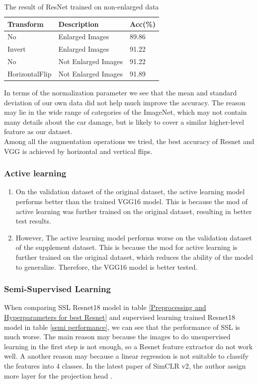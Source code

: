 \documentclass[lang=english,inputenc=utf8,fontsize=10pt]{ldvarticle}
\begin{document}
\begin{table}[H]   
\begin{center}   
\caption{The result of ResNet trained on non-enlarged data}  
\label{table:1} 
\begin{tabular}{|m{2.4cm}<{\centering}|m{6cm}<{\centering}|m{2.0cm}<{\centering}|}   
\hline   \textbf{Transform} & \textbf{Description} & \textbf{Acc(\%)} \\   
\hline   No & Enlarged Images & 89.86  \\  
\hline   Invert & Enlarged Images & 91.22  \\      
\hline   No & Not Enlarged Images & 91.22  \\  
\hline   HorizontalFlip & Not Enlarged Images & 91.89  \\      
\hline   
\end{tabular}   
\end{center}   
\end{table}

In terms of the normalization parameter we see that the mean and standard deviation of our own data did not help much improve the accuracy. The reason may lie in the wide range of categories of the ImageNet, which may not contain many details about the car damage, but is likely to cover a similar higher-level feature as our dataset.\\

Among all the augmentation operations we tried, the best accuracy of Resnet and VGG is achieved by horizontal and vertical flips.


\subsubsection{Active learning}
    \begin{enumerate}
        \item On the validation dataset of the original dataset, the active learning model performs better than the trained VGG16 model. This is because the mod of active learning was further trained on the original dataset, resulting in better test results.
        \item However, The active learning model performs worse on the validation dataset of the supplement dataset. This is because the mod for active learning is further trained on the original dataset, which reduces the ability of the model to generalize. Therefore, the VGG16 model is better tested.
    \end{enumerate}
\subsubsection{Semi-Supervised Learning}
When comparing SSL Resnet18 model in table \ref{Preprocessing and Hyperparameters for best Resnet} and supervised learning trained Resnet18 model in table \ref{semi performance}, we can see that the performance of SSL is much worse. The main reason may because the images to do unsupervised learning in the first step is not enough, so a Resnet feature extractor do not work well. A another reason may because a linear regression is not suitable to classify the features into 4 classes. In the latest paper of SimCLR v2, the author assign more layer for the projection head \cite{ref1}.
\end{document}
